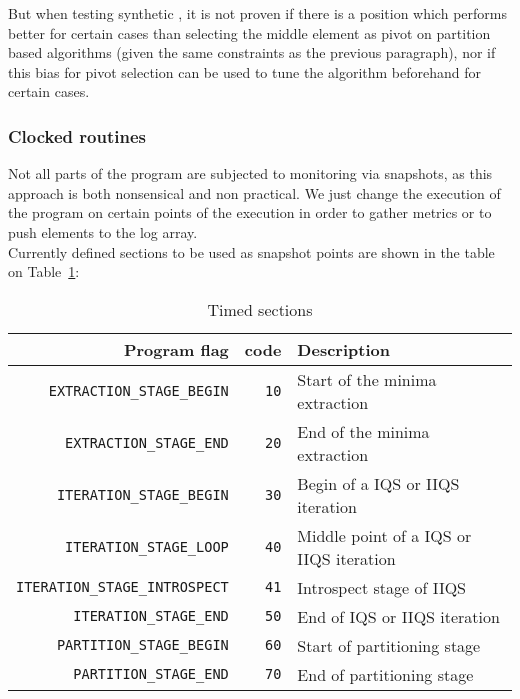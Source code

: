 But when testing synthetic , it is not proven if there is a position which performs better for certain cases than selecting the middle element as pivot on partition based algorithms (given the same constraints as the previous paragraph), nor if this bias for pivot selection can be used to tune the algorithm beforehand for certain cases.\\

\subsubsection{Clocked routines}
Not all parts of the program are subjected to monitoring via snapshots, as this approach is both nonsensical and non practical. We just change the execution of the program on certain points of the execution in order to gather metrics or to push elements to the log array. \\

Currently defined sections to be used as snapshot points are shown in the table on Table~\ref{TABLE:POINTS}:

\begin{table}[!ht]
    \centering
    \begin{tabularx}{\linewidth}{|r|r|X|}
        \hline
        Program flag & code & Description \\
        \hline
        \texttt{EXTRACTION\_STAGE\_BEGIN} & \texttt{10} & Start of the minima extraction\\
        \hline
        \texttt{EXTRACTION\_STAGE\_END} & \texttt{20} & End of the minima extraction \\
        \hline
        \texttt{ITERATION\_STAGE\_BEGIN} & \texttt{30} & Begin of a IQS or IIQS iteration \\
        \hline
        \texttt{ITERATION\_STAGE\_LOOP} & \texttt{40} & Middle point of a IQS or IIQS iteration \\
        \hline
        \texttt{ITERATION\_STAGE\_INTROSPECT} & \texttt{41} & Introspect stage of IIQS \\
        \hline
        \texttt{ITERATION\_STAGE\_END} & \texttt{50} & End of IQS or IIQS iteration \\
        \hline
        \texttt{PARTITION\_STAGE\_BEGIN} & \texttt{60} & Start of partitioning stage \\
        \hline
        \texttt{PARTITION\_STAGE\_END} & \texttt{70} & End of partitioning stage \\
        \hline
    \end{tabularx}
    
    \caption{Timed sections}
    \label{TABLE:POINTS}
\end{table}

\FloatBarrier
